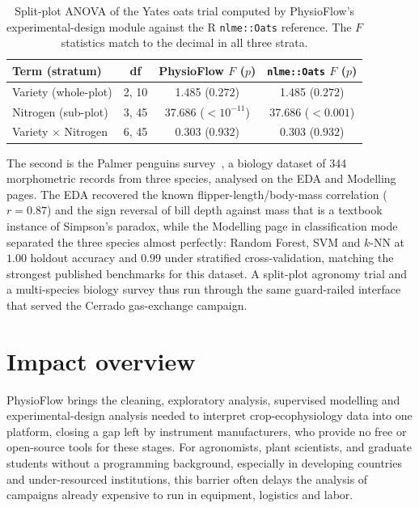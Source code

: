 \documentclass[a4paper,fleqn]{cas-dc}
\begin{document}
\begin{table}[t]
\centering
\footnotesize
\begin{tabular}{lccc}
\toprule
\textbf{Term (stratum)} & \textbf{df} & \textbf{PhysioFlow $F$ ($p$)} & \textbf{\texttt{nlme::Oats} $F$ ($p$)} \\
\midrule
Variety (whole-plot)      & 2, 10 & 1.485 ($0.272$)        & 1.485 ($0.272$) \\
Nitrogen (sub-plot)       & 3, 45 & 37.686 ($<10^{-11}$)   & 37.686 ($<0.001$) \\
Variety $\times$ Nitrogen & 6, 45 & 0.303 ($0.932$)        & 0.303 ($0.932$) \\
\bottomrule
\end{tabular}
\caption{Split-plot ANOVA of the Yates oats trial computed by PhysioFlow's experimental-design module against the R \texttt{nlme::Oats} reference. The $F$ statistics match to the decimal in all three strata.}\label{tbl:oats}
\end{table}

The second is the Palmer penguins survey~\cite{Gorman2014}, a biology dataset of 344 morphometric records from three species, analysed on the EDA and Modelling pages. The EDA recovered the known flipper-length/body-mass correlation ($r=0.87$) and the sign reversal of bill depth against mass that is a textbook instance of Simpson's paradox, while the Modelling page in classification mode separated the three species almost perfectly: Random Forest, SVM and $k$-NN at $1.00$ holdout accuracy and $0.99$ under stratified cross-validation, matching the strongest published benchmarks for this dataset. A split-plot agronomy trial and a multi-species biology survey thus run through the same guard-railed interface that served the Cerrado gas-exchange campaign.

\section{Impact overview}\label{sec:impact}

PhysioFlow brings the cleaning, exploratory analysis, supervised modelling and experimental-design analysis needed to interpret crop-ecophysiology data into one platform, closing a gap left by instrument manufacturers, who provide no free or open-source tools for these stages. For agronomists, plant scientists, and graduate students without a programming background, especially in developing countries and under-resourced institutions, this barrier often delays the analysis of campaigns already expensive to run in equipment, logistics and labor.
\end{document}
